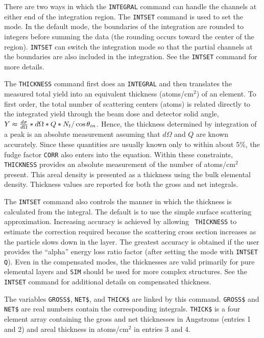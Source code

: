 {{{{{There are two ways in which the {\tt INTEGRAL} command can handle the channels
at either end of the integration region.  The {\tt INTSET} command is used
to set the mode.  In the default mode, the boundaries of the integration are
rounded to integers before summing the data (the rounding occurs toward the
center of the region).  {\tt INTSET} can switch the integration mode so that
the partial channels at the boundaries are also included in the integration.
See the {\tt INTSET} command for more details.

The {\tt THICKNESS} command first does an {\tt INTEGRAL} and then translates
the measured total yield into an equivalent thickness (atoms/cm$^2$) of an
element.   To first order, the total number of scattering centers (atoms) is
related directly to the integrated yield through the beam dose and detector
solid angle, $Y \approx {{d\sigma} \over {d\Omega}} * d\Omega * Q * N_t /
\cos \theta_{in}$.  Hence, the thickness determined by integration of a peak
is an absolute measurement assuming that $d\Omega$ and $Q$ are known
accurately.  Since these quantities
are usually known only to within about 5\%, the fudge factor {\tt CORR} also
enters into the equation.   Within these constraints, {\tt THICKNESS} provides
an absolute measurement of the number of atoms/cm$^2$ present.  This areal
density is presented as a thickness using the bulk elemental density. 
Thickness values are reported for both the gross and net integrals.

The {\tt INTSET} command also controls the manner in which the thickness is
calculated from the integral.  The default is to use the simple surface
scattering approximation.  Increasing accuracy is achieved by allowing {\tt
THICKNESS} to estimate the correction required because the scattering cross
section increases as the particle slows down in the layer.  The greatest
accuracy is obtained if the user provides the ``alpha'' energy loss ratio
factor (after setting the mode with {\tt INTSET Q}).  Even in the
compensated modes, the thicknesses are valid primarily for pure elemental
layers and {\tt SIM} should be used for more complex structures.  See the
{\tt INTSET} command for additional details on compensated thickness.

The variables {\tt GROSS\$}, {\tt NET\$}, and {\tt THICK\$} are linked by this
command. {\tt GROSS\$} and {\tt NET\$} are real numbers contain the
corresponding integrals.  {\tt THICK\$} is a four element array containing the
gross and net thicknesses in Angstroms (entries 1 and 2) and areal thickness
in atoms/cm$^2$ in entries 3 and 4.

}}}}}
